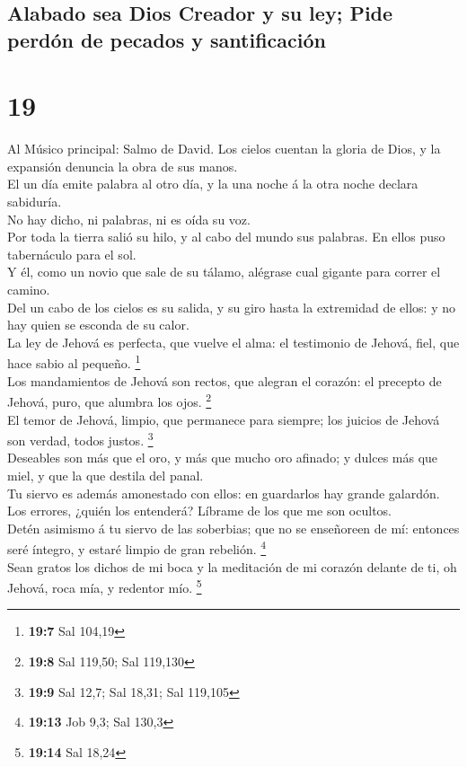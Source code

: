 \hypertarget{alabado-sea-dios-creador-y-su-ley-pide-perduxf3n-de-pecados-y-santificaciuxf3n}{%
\subsection{Alabado sea Dios Creador y su ley; Pide perdón de pecados y
santificación}\label{alabado-sea-dios-creador-y-su-ley-pide-perduxf3n-de-pecados-y-santificaciuxf3n}}

\hypertarget{section-18}{%
\section{19}\label{section-18}}

 Al Músico principal: Salmo de David. Los cielos cuentan
la gloria de Dios, y la expansión denuncia la obra de sus manos.\\
 El un día emite palabra al otro día, y la una noche á la
otra noche declara sabiduría.\\
 No hay dicho, ni palabras, ni es oída su voz.\\
 Por toda la tierra salió su hilo, y al cabo del mundo sus
palabras. En ellos puso tabernáculo para el sol.\\
 Y él, como un novio que sale de su tálamo, alégrase cual
gigante para correr el camino.\\
 Del un cabo de los cielos es su salida, y su giro hasta
la extremidad de ellos: y no hay quien se esconda de su calor.\\
 La ley de Jehová es perfecta, que vuelve el alma: el
testimonio de Jehová, fiel, que hace sabio al pequeño. \footnote{\textbf{19:7}
  Sal 104,19}\\
 Los mandamientos de Jehová son rectos, que alegran el
corazón: el precepto de Jehová, puro, que alumbra los ojos.
\footnote{\textbf{19:8} Sal 119,50; Sal 119,130}\\
 El temor de Jehová, limpio, que permanece para siempre;
los juicios de Jehová son verdad, todos justos. \footnote{\textbf{19:9}
  Sal 12,7; Sal 18,31; Sal 119,105}\\
 Deseables son más que el oro, y más que mucho oro
afinado; y dulces más que miel, y que la que destila del panal.\\
 Tu siervo es además amonestado con ellos: en guardarlos
hay grande galardón.\\
 Los errores, ¿quién los entenderá? Líbrame de los que me
son ocultos.\\
 Detén asimismo á tu siervo de las soberbias; que no se
enseñoreen de mí: entonces seré íntegro, y estaré limpio de gran
rebelión. \footnote{\textbf{19:13} Job 9,3; Sal 130,3}\\
 Sean gratos los dichos de mi boca y la meditación de mi
corazón delante de ti, oh Jehová, roca mía, y redentor mío. \footnote{\textbf{19:14}
  Sal 18,24}

